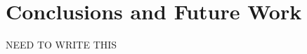 \documentclass{article}
\begin{document}
\section{Conclusions and Future Work}
NEED TO WRITE THIS

%
%
\end{document}
